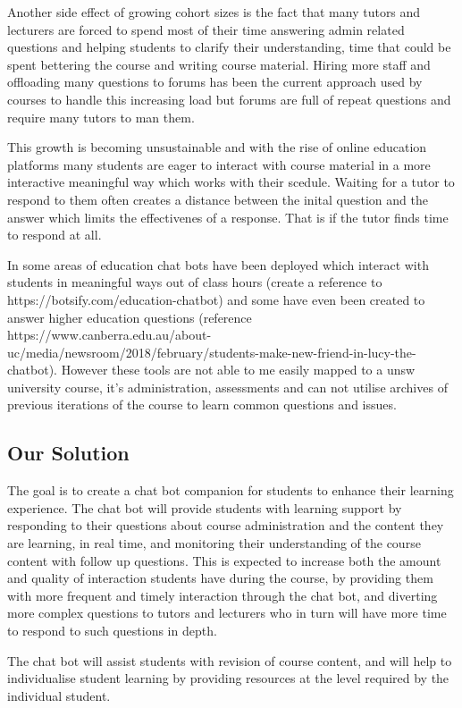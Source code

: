 \documentclass{article}
\begin{document}
Another side effect of growing cohort sizes is the fact that many tutors and lecturers are forced to spend most of their time answering admin related questions and helping students to clarify their understanding, time that could be spent bettering the course and writing course material. Hiring more staff and offloading many questions to forums has been the current approach used by courses to handle this increasing load but forums are full of repeat questions and require many tutors to man them. 

This growth is becoming unsustainable and with the rise of online education platforms many students are eager to interact with course material in a more interactive meaningful way which works with their scedule. Waiting for a tutor to respond to them often creates a distance between the inital question and the answer which limits the effectivenes of a response. That is if the tutor finds time to respond at all. 

In some areas of education chat bots have been deployed which interact with students in meaningful ways out of class hours (create a reference to https://botsify.com/education-chatbot) and some have even been created to answer higher education questions (reference https://www.canberra.edu.au/about-uc/media/newsroom/2018/february/students-make-new-friend-in-lucy-the-chatbot). However these tools are not able to me easily mapped to a unsw university course, it's administration, assessments and can not utilise archives of previous iterations of the course to learn common questions and issues.

\subsection{Our Solution}

The goal is to create a chat bot companion for students to enhance their learning experience. The chat bot will provide students with learning support by responding to their questions about course administration and the content they are learning, in real time, and monitoring their understanding of the course content with follow up questions. This is expected to increase both the amount and quality of interaction students have during the course, by providing them with more frequent and timely interaction through the chat bot, and diverting more complex questions to tutors and lecturers who in turn will have more time to respond to such questions in depth. 

The chat bot will assist students with revision of course content, and will help to individualise student learning by providing resources at the level required by the individual student.
\end{document}
